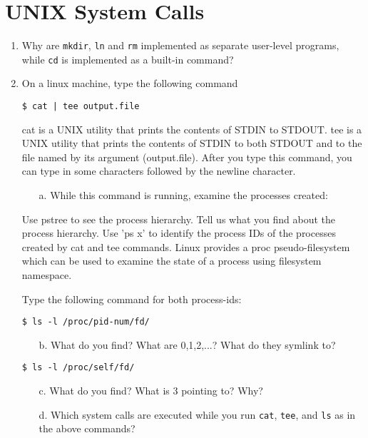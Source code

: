 \addtolength{\oddsidemargin}{-.875in}
\addtolength{\evensidemargin}{-.875in}
\addtolength{\textwidth}{1.75in}
\addtolength{\topmargin}{-.875in}
\addtolength{\textheight}{1.75in}

\section{UNIX System Calls}
\begin{enumerate}
\item Why are {\tt mkdir}, {\tt ln} and {\tt rm} implemented as separate user-level programs, while {\tt cd} is implemented as a built-in command?

\item On a linux machine, type the following command
\begin{verbatim}
$ cat | tee output.file
\end{verbatim}
cat is a UNIX utility that prints the contents of STDIN to STDOUT. tee is a UNIX utility that prints the contents of STDIN to both STDOUT and to the file named by its argument (output.file). After you type this command, you can type in some characters followed by the newline character.

\begin{enumerate}
\item[a.] While this command is running, examine the processes created:
\end{enumerate}

Use pstree to see the process hierarchy. Tell us what you find about the process hierarchy.
Use 'ps x' to identify the process IDs of the processes created by cat and tee commands. Linux provides a proc pseudo-filesystem which can be used to examine the state of a process using filesystem namespace.

Type the following command for both process-ids:
\begin{verbatim}
$ ls -l /proc/pid-num/fd/
\end{verbatim}

\begin{enumerate}
\item[b.] What do you find? What are 0,1,2,...? What do they symlink to?
\end{enumerate}

\begin{verbatim}
$ ls -l /proc/self/fd/
\end{verbatim}

\begin{enumerate}
\item[c.] What do you find? What is 3 pointing to? Why?
\item[d.] Which system calls are executed while you run {\tt cat}, {\tt tee}, and {\tt ls} as in the above commands?
\end{enumerate}


\end{enumerate}
